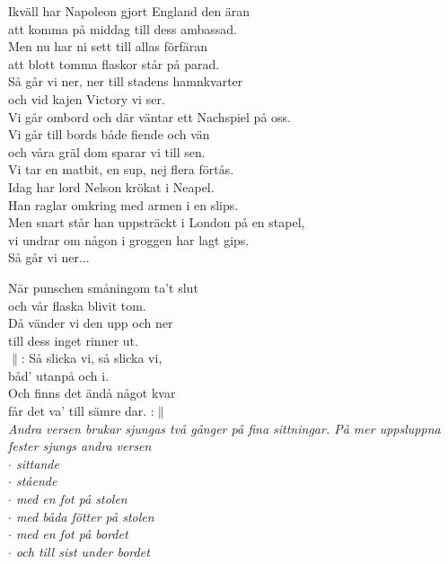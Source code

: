 \documentclass[a6paper, 10pt, twoside]{article}
\begin{document}
\noindent
\begin{center}
\end{center}
\begin{lyrics}
Ikväll har Napoleon gjort England den äran\\
att komma på middag till dess ambassad.\\
Men nu har ni sett till allas förfäran\\
att blott tomma flaskor står på parad.
\vspace{5pt}\\
Så går vi ner, ner till stadens hamnkvarter\\
och vid kajen Victory vi ser.\\
Vi går ombord och där väntar ett Nachspiel på oss.\\
Vi går till bords både fiende och vän\\
och våra gräl dom sparar vi till sen.\\
Vi tar en matbit, en sup, nej flera förtås.
\vspace{5pt}\\
Idag har lord Nelson krökat i Neapel.\\
Han raglar omkring med armen i en slips.\\
Men snart står han uppsträckt i London på en stapel,\\
vi undrar om någon i groggen har lagt gips.
\vspace{5pt}\\
Så går vi ner...
\end{lyrics}

\noindent
\begin{center}
\end{center}
\begin{lyrics}
När punschen småningom ta't slut\\
och vår flaska blivit tom.\\
Då vänder vi den upp och ner\\
till dess inget rinner ut.
\vspace{5pt}\\
$\|$: Så slicka vi, så slicka vi,\\
båd' utanpå och i.\\
Och finns det ändå något kvar\\
får det va' till sämre dar. :$\|$
\vspace{10pt}\\
\textit{Andra versen brukar sjungas två gånger på fina sittningar. På mer uppsluppna fester sjungs andra versen\\
$\cdot$ sittande\\
$\cdot$ stående\\
$\cdot$ med en fot på stolen\\
$\cdot$ med båda fötter på stolen\\
$\cdot$ med en fot på bordet\\
$\cdot$ och till sist under bordet}
\end{lyrics}
\end{document}
